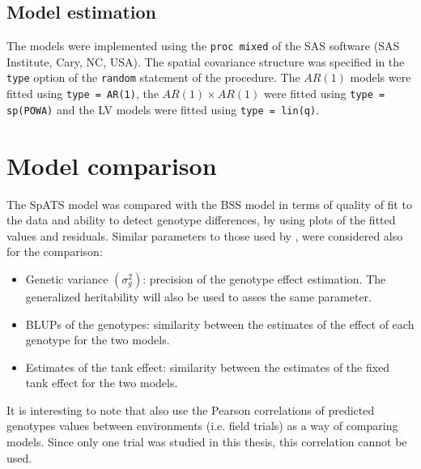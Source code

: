\subsection{Model estimation}
The models were implemented using the \verb|proc mixed| of the SAS software (SAS Institute, Cary, NC, USA). The spatial covariance structure was specified in the \verb|type| option of the \verb|random| statement of the procedure. The $AR(1)$ models were fitted using \verb|type = AR(1)|, the $AR(1)\times AR(1)$ were fitted using \verb|type = sp(POWA)| and the LV models were fitted using \verb|type = lin(q)|.

\section{Model comparison}
The SpATS model was compared with the BSS model in terms of quality of fit to the data and ability to detect genotype differences, by using plots of the fitted values and residuals. Similar parameters to those used by \textcite{velazco_modelling_2017}, were considered also for the comparison:
\begin{itemize}
    \item Genetic variance $(\sigma_g^2)$: precision of the genotype effect estimation. The generalized heritability will also
    be used to asses the same parameter.
    \item BLUPs of the genotypes: similarity between the estimates of the effect of each genotype for the two models.
    \item Estimates of the tank effect: similarity between the estimates of the fixed tank effect for the two models.
\end{itemize}
It is interesting to note that \textcite{rodriguez-alvarez_correcting_2018} also use the Pearson correlations of predicted genotypes values between environments (i.e. field trials) as a way of comparing models. Since only one trial was studied in this thesis, this correlation cannot be used.
